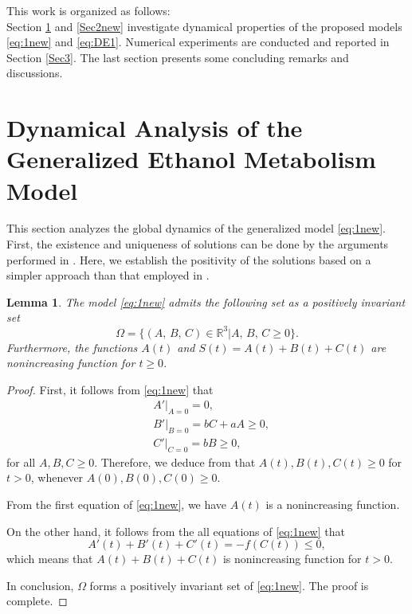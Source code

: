 \documentclass[12pt]{article}
\newtheorem{lemma}[theorem]{Lemma}
\theoremstyle{definition}
\theoremstyle{remark}
\numberwithin{equation}{section}
\begin{document}
This work is organized as follows:\\
Section \ref{Sec2} and \ref{Sec2new} investigate dynamical properties of the proposed models \eqref{eq:1new} and \eqref{eq:DE1}. Numerical experiments are conducted and reported in Section \ref{Sec3}. The last section presents some concluding remarks and discussions.
\section{Dynamical Analysis of the Generalized Ethanol Metabolism Model}\label{Sec2}
This section analyzes the global dynamics of the generalized model \eqref{eq:1new}. First, the existence and uniqueness of solutions can be done by the arguments performed in \cite{Wacker1}. Here, we establish the positivity of the solutions based on a simpler approach than that employed in \cite{Wacker1}.
\begin{lemma}\label{Lemma1}
The model \eqref{eq:1new} admits the following set as a positively invariant set
\begin{equation}\label{eq:5}
\Omega = \big\{(A,\,B,\,C) \in \mathbb{R}^3|A,\, B,\, C \geq 0\big\}.
\end{equation}
Furthermore, the functions $A(t)$ and $S(t) = A(t) + B(t) + C(t)$ are nonincreasing function for $t \geq 0$.
\end{lemma}
\begin{proof}
First, it follows from \eqref{eq:1new} that
\begin{equation*}
\begin{split}
&A'|_{A = 0} = 0,\\
&B'|_{B = 0} = b C + a A \geq 0,\\
&C'|_{C = 0} = b B \geq 0,
\end{split}
\end{equation*}
for all $A, B, C \geq 0$. Therefore, we deduce from \cite[Proposition B.7]{Smith} that $A(t), B(t), C(t) \ge0$ for $t>0$, whenever $A(0), B(0), C(0) \ge0$.

From the first equation of \eqref{eq:1new}, we have $A(t)$ is a nonincreasing function.

On the other hand, it follows from the all equations of \eqref{eq:1new} that
\begin{equation*}
A'(t) + B'(t) + C'(t) = -f(C(t)) \leq 0,
\end{equation*}
which means that $A(t) + B(t) + C(t)$ is nonincreasing function for $t > 0$.

In conclusion, $\Omega$ forms a positively invariant set of \eqref{eq:1new}. The proof is complete.
\end{proof}
\end{document}

